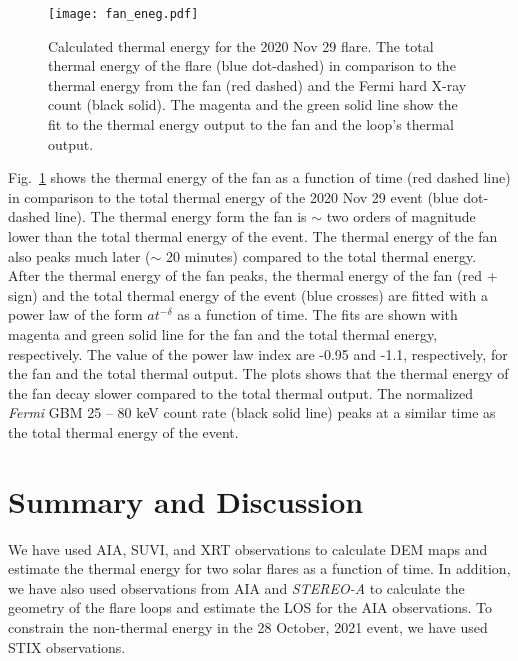 \begin{figure}[ht!]
    \centering
    \texttt{[image: fan\_eneg.pdf]}
    \caption{Calculated thermal energy for the 2020 Nov 29 flare. The total thermal energy of the flare (blue dot-dashed) in comparison to the thermal energy from the fan (red dashed) and the Fermi hard X-ray count (black solid). The magenta and the green solid line show the fit to the thermal energy output to the fan and the loop's thermal output.}
    \label{fig:fan_eneg}
    \end{figure}

Fig.~\ref{fig:fan_eneg} shows the thermal energy of the fan as a function of time (red dashed line) in comparison to the total thermal energy of the 2020 Nov 29 event (blue dot-dashed line). The thermal energy form the fan is $\sim$ two orders of magnitude lower than the total thermal energy of the event. The thermal energy of the fan also peaks much later ($\sim$ 20 minutes) compared to the total thermal energy. After the thermal energy of the fan peaks, the thermal energy of the fan (red + sign) and the total thermal energy of the event (blue crosses) are fitted with a power law of the form $at^{-\delta}$ as a function of time. The fits are shown with magenta and green solid line for the fan and the total thermal energy, respectively. The value of the power law index are -0.95 and -1.1, respectively, for the fan and the total thermal output. The plots shows that the thermal energy of the fan decay slower compared to the total thermal output. The normalized {\it Fermi} GBM 25 {--} 80 keV count rate (black solid line) peaks at a similar time as the total thermal energy of the event. 

\section{Summary and Discussion}\label{sec:dis}

We have used AIA, SUVI, and XRT observations to calculate DEM maps and estimate the thermal energy for two solar flares as a function of time. In addition, we have also used observations from AIA and {\it STEREO-A} to calculate the geometry of the flare loops and estimate the LOS for the AIA observations. To constrain the non-thermal energy in the 28 October, 2021 event, we have used STIX observations.  
 
